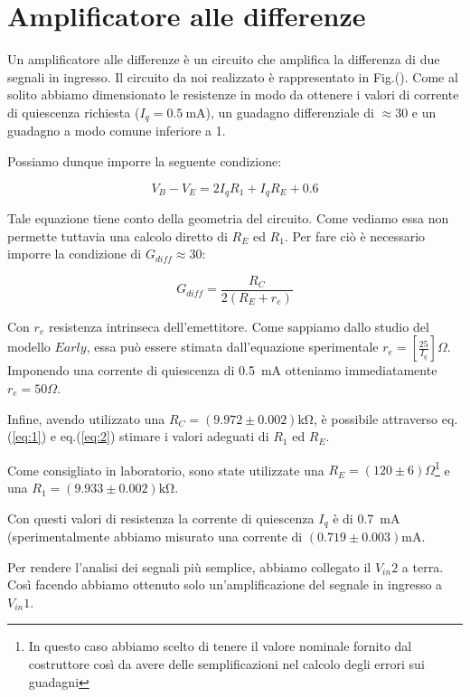\section{Amplificatore alle differenze}
Un amplificatore alle differenze è un circuito che amplifica la differenza di due segnali in ingresso. 
Il circuito da noi realizzato è rappresentato in Fig.().
Come al solito abbiamo dimensionato le resistenze in modo da ottenere i valori di corrente di quiescenza richiesta ($I_q=\SI{0.5}{\milli\ampere}$), un guadagno differenziale di $\approx 30$ e un guadagno a modo comune inferiore a 1.

Possiamo dunque imporre la seguente condizione:

\begin{equation}
V_B-V_E=2I_q R_1 + I_q R_E + 0.6
\label{eq:1}
\end{equation}

Tale equazione tiene conto della geometria del circuito. Come vediamo essa non permette tuttavia una calcolo diretto di $R_E$ ed $R_1$. Per fare ciò è necessario imporre la condizione di $G_{diff} \approx 30$:

\begin{equation}
G_{diff}=\frac{R_C}{2(R_E+r_e)}
\label{eq:2}
\end{equation}

Con $r_e$ resistenza intrinseca dell'emettitore. Come sappiamo dallo studio del modello $Early$, essa può essere stimata dall'equazione sperimentale $r_e = [\frac{25}{I_q}] \Omega$. Imponendo una corrente di quiescenza di \SI{0.5}{\milli\ampere} otteniamo immediatamente $r_e=50 \Omega$. 

Infine, avendo utilizzato una $R_C=(9.972\pm0.002)\si{\kilo\ohm}$, è possibile attraverso eq.(\ref{eq:1}) e eq.(\ref{eq:2}) stimare i valori adeguati di $R_1$ ed $R_E$. 

Come consigliato in laboratorio, sono state utilizzate una $R_E=(120\pm6) \Omega$\footnote{In questo caso abbiamo scelto di tenere il valore nominale fornito dal costruttore così da avere delle semplificazioni nel calcolo degli errori sui guadagni} e una $R_1= (9.933 \pm 0.002)\si{\kilo\ohm}$.

Con questi valori di resistenza la corrente di quiescenza $I_q$ è di \SI{0.7}{\milli\ampere} (sperimentalmente abbiamo misurato una corrente di $(0.719 \pm 0.003) \si{\milli\ampere}$.

Per rendere l'analisi dei segnali più semplice, abbiamo collegato il $V_{in}2$ a terra.
Così facendo abbiamo ottenuto solo un'amplificazione del segnale in ingresso a $V_{in}1$. 


